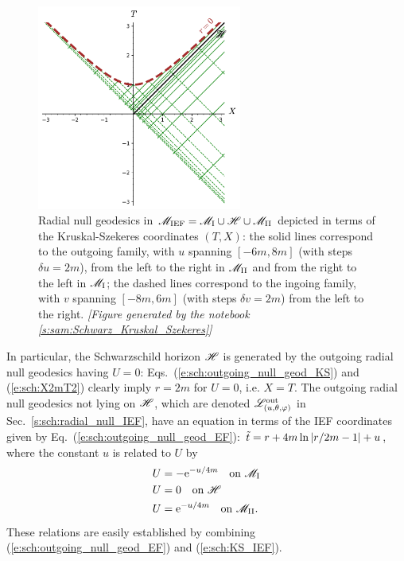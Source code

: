 \begin{figure}
\centerline{\includegraphics[width=0.6\textwidth]{max_rad_null_geod_KS.pdf}}
\caption[]{\label{f:sch:rad_null_geod_KS} \footnotesize
Radial null geodesics in $\mathscr{M}_{\rm IEF} = \mathscr{M}_{\rm I}\cup\mathscr{H}\cup\mathscr{M}_{\rm II}$
depicted in terms of the Kruskal-Szekeres coordinates $(T,X)$: the solid
lines correspond to the outgoing family, with $u$ spanning $[-6m, 8m]$
(with steps $\delta u = 2m$), from the left to the right in $\mathscr{M}_{\rm II}$
and from the right to the left in $\mathscr{M}_{\rm I}$; the dashed lines
correspond to the ingoing family, with $v$ spanning $[-8m, 6m]$ (with steps $\delta v = 2m$)
from the left to the right.
\textsl{[Figure generated by the notebook \ref{s:sam:Schwarz_Kruskal_Szekeres}]}
}
\end{figure}
In particular, the Schwarzschild horizon $\mathscr{H}$ is generated by the
outgoing radial null geodesics having $U=0$:
Eqs.~(\ref{e:sch:outgoing_null_geod_KS}) and (\ref{e:sch:X2mT2})
clearly imply $r=2m$ for $U=0$, i.e. $X=T$.
The outgoing radial null geodesics not lying on $\mathscr{H}$, which are
denoted $\mathscr{L}^{\rm out}_{(u,\theta,\varphi)}$ in Sec.~\ref{s:sch:radial_null_IEF}, have an equation
in terms of the IEF coordinates given by
Eq.~(\ref{e:sch:outgoing_null_geod_EF}):
${\tilde t} = r + 4 m \ln \left|r/2m- 1 \right| + u$,
where the constant $u$ is related to $U$ by
\begin{subequations}
\begin{align}
 & U = - \mathrm{e}^{-u/4m} \quad \mbox{on}\ \mathscr{M}_{\rm I} \\
 & U = 0 \quad \mbox{on}\ \mathscr{H} \\
 & U =  \mathrm{e}^{-u/4m} \quad \mbox{on}\ \mathscr{M}_{\rm II} .
\end{align}
\end{subequations}
These relations are easily established by combining
(\ref{e:sch:outgoing_null_geod_EF}) and (\ref{e:sch:KS_IEF}).



